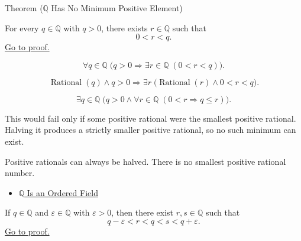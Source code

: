 \begin{theorembox}{Theorem ($\mathbb{Q}$ Has No Minimum Positive Element)}
\begin{theorem}
\label{thm:q-has-no-minimum-positive-element}
For every $q\in\mathbb{Q}$ with $q>0$, there exists $r\in\mathbb{Q}$ such that
\[
0<r<q.
\]
\hyperref[prf:q-has-no-minimum-positive-element]{Go to proof.}
\end{theorem}
\end{theorembox}

\begin{remark*}
\[
\forall q\in\mathbb{Q}\;
\bigl(q>0 \Longrightarrow \exists r\in\mathbb{Q}\;(0<r<q)\bigr).
\]
\end{remark*}

\begin{remark*}
\[
\operatorname{Rational}(q)\land q>0
\Longrightarrow
\exists r\;\bigl(\operatorname{Rational}(r)\land 0<r<q\bigr).
\]
\end{remark*}

\begin{remark*}
\[
\exists q\in\mathbb{Q}\;
\bigl(q>0 \land \forall r\in\mathbb{Q}\;(0<r \Longrightarrow q\le r)\bigr).
\]
\end{remark*}

\begin{remark*}
This would fail only if some positive rational were the smallest positive
rational. Halving it produces a strictly smaller positive rational, so no such
minimum can exist.
\end{remark*}

\begin{remark*}[Interpretation]
Positive rationals can always be halved. There is no smallest positive
rational number.
\end{remark*}

\begin{dependencies}
\begin{itemize}
  \item \hyperref[thm:q-is-ordered-field]{$\mathbb{Q}$ Is an Ordered Field}
\end{itemize}
\end{dependencies}

\begin{lemma}
\label{lem:rational-upper-lower-perturbation}
If $q\in\mathbb{Q}$ and $\varepsilon\in\mathbb{Q}$ with $\varepsilon>0$,
then there exist $r,s\in\mathbb{Q}$ such that
\[
q-\varepsilon < r < q < s < q+\varepsilon.
\]
\hyperref[prf:rational-upper-lower-perturbation]{Go to proof.}
\end{lemma}

